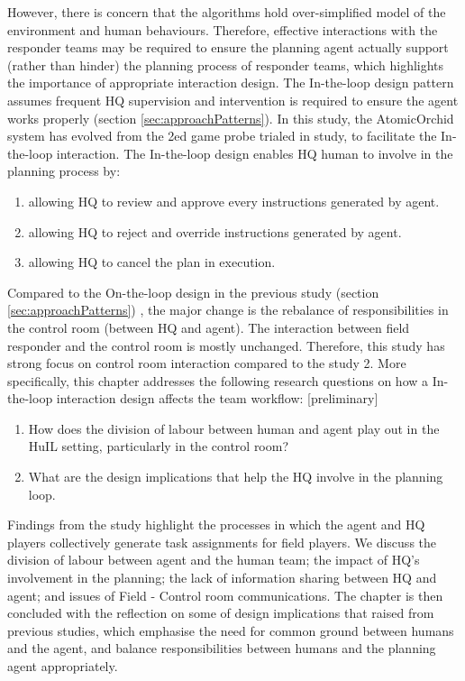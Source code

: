 However, there is concern that the algorithms hold over-simplified model of the environment and human behaviours. Therefore, effective interactions with the responder teams may be required to ensure the planning agent actually support (rather than hinder) the planning process of responder teams, which highlights the importance of appropriate interaction design. The In-the-loop design pattern assumes frequent HQ supervision and intervention is required to ensure the agent works properly (section \ref{sec:approachPatterns}). In this study, the AtomicOrchid system has evolved from the 2ed game probe trialed in study, to facilitate the In-the-loop interaction. The In-the-loop design enables HQ human to involve in the planning process by: \\

\begin{enumerate}
	\item allowing HQ to review and approve every instructions generated by agent.
	\item allowing HQ to reject and override instructions generated by agent.
	\item allowing HQ to cancel the plan in execution. 
\end{enumerate}

Compared to the On-the-loop design in the previous study (section \ref{sec:approachPatterns}) , the major change is the rebalance of responsibilities in the control room (between HQ and agent). The interaction between field responder and the control room is mostly unchanged. Therefore, this study has strong focus on control room interaction compared to the study 2. More specifically, this chapter addresses the following research questions on how a In-the-loop interaction design affects the team workflow: [preliminary]\\

\begin{enumerate}
 \item How does the division of labour between human and agent play out in the HuIL setting, particularly in the control room?\\
 \item What are the design implications that help the HQ involve in the planning loop. 
\end{enumerate}

Findings from the study highlight the processes in which the agent and HQ players collectively generate task assignments for field players. We discuss the division of labour between agent and the human team; the impact of HQ's involvement in the planning; the lack of information sharing between HQ and agent; and issues of Field - Control room communications. The chapter is then concluded with the reflection on some of design implications that raised from previous studies, which emphasise the need for common ground between humans and the agent, and balance responsibilities between humans and the planning agent appropriately.\\

